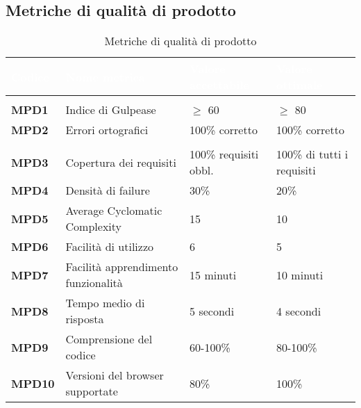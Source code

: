\newpage

\subsection{Metriche di qualità di prodotto}
{
\renewcommand{\arraystretch}{1.5}
\setlength\arrayrulewidth{0.9pt}
\begin{longtable}{C{2.5cm} | C{5cm} | C{4cm} | C{4cm}}
\textcolor{white}{\textbf{Codice}}&
\textcolor{white}{\textbf{Nome metrica}}&
\textcolor{white}{\textbf{Valore accettabile}}&
\textcolor{white}{\textbf{Valore ottimale}}\\	
\endhead
\endfoot
{}\caption{Metriche di qualità di prodotto}
\endlastfoot

 \\

	\textbf{MPD1} & Indice di Gulpease & $\geq$ 60 & $\geq$ 80\\
	\textbf{MPD2} & Errori ortografici & 100\% corretto & 100\% corretto \\
	
 \\

	\textbf{MPD3} & Copertura dei requisiti & 100\% requisiti obbl. & 100\% di tutti i requisiti \\
		
	\textbf{MPD4} & Densità di failure & 30\% & 20\% \\

	\textbf{MPD5} & Average Cyclomatic Complexity & 15 & 10 \\		
	\textbf{MPD6} & Facilità di utilizzo & 6 & 5 \\
	\textbf{MPD7} & Facilità apprendimento funzionalità & 15 minuti & 10 minuti\\

 	\textbf{MPD8} & Tempo medio di risposta & 5 secondi & 4 secondi \\
	
 	\textbf{MPD9} & Comprensione del codice & 60-100\% & 80-100\% \\

	\textbf{MPD10} & Versioni del browser supportate & 80\% & 100\% \\
\end{longtable}


	
}
